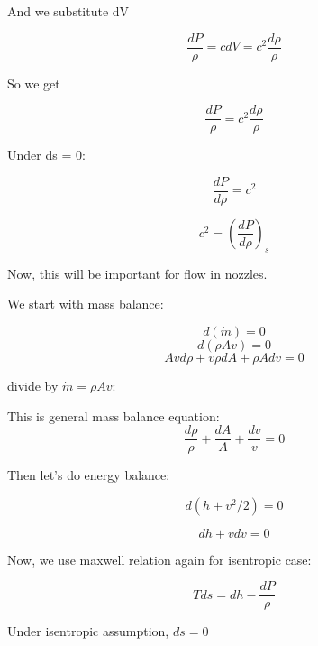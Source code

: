 \documentclass[masters]{ucbthesis}
\renewcommand{\_}{\kern-1.5pt\textunderscore\kern-1.5pt}
\begin{document}
And we substitute dV 


\begin{equation*}
	\frac{dP}{\rho} =  c dV = c^2 \frac{d \rho}{\rho}
\end{equation*}

So we get

\begin{equation*}
	\frac{dP}{\rho} = c^2 \frac{d \rho}{\rho}
\end{equation*}

Under ds = 0:

\begin{equation*}
	\frac{dP}{d \rho} = c^2 
\end{equation*}


\begin{equation*}
	c^2 = \left(\frac{dP}{d \rho} \right)_s
\end{equation*}

Now, this will be important for flow in nozzles.

We start with mass balance:

\begin{equation*}
	d (\dot{m}) = 0
\end{equation*}
\begin{equation*}
	d (\rho A v) = 0
\end{equation*}
\begin{equation*}
	A v d\rho + v \rho dA  + \rho A dv = 0
\end{equation*}

divide by $\dot{m} = \rho A v$:

This is general mass balance equation:
\begin{equation*}
	\frac{d\rho}{\rho} + \frac{dA}{A}  + \frac{dv}{v} = 0
\end{equation*}


Then let's do energy balance:


\begin{equation*}
	d( h + v^2/2) = 0
\end{equation*}


\begin{equation*}
	dh + vdv = 0
\end{equation*}

Now, we use maxwell relation again for isentropic case:


\begin{equation*}
	T ds = dh -  \frac{dP}{\rho}
\end{equation*}

Under isentropic assumption, $ds = 0$
\end{document}
